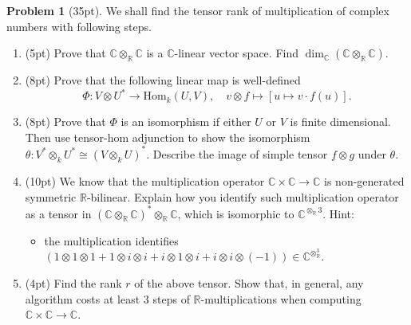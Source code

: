 \documentclass{MainStyle}
\theoremstyle{definition}
\newtheorem{problem}{Problem}
\begin{document}
\begin{problem}[35pt]
We shall find the tensor rank of multiplication of complex numbers with following steps.
\begin{enumerate}
    \item (5pt) Prove that $\mathbb C\otimes _{\mathbb R}\mathbb C$ is a $\mathbb C$-linear vector space. Find $\dim_{\mathbb C}(\mathbb C\otimes _{\mathbb R}\mathbb C)$.
    \item (8pt) Prove that the following linear map is well-defined
          \begin{equation}
              \Phi: V\otimes U^\ast\to \mathrm{Hom}_k(U,V),\quad v\otimes f\mapsto [u\mapsto v\cdot f(u)].
          \end{equation}
    \item (8pt) Prove that $\Phi$ is an isomorphism if either $U$ or $V$ is finite dimensional. Then use tensor-hom adjunction to show the isomorphism $\theta: V^\ast \otimes_k U^\ast \cong (V\otimes_k U)^\ast$. Describe the image of simple tensor $f\otimes g$ under $\theta$.
    \item (10pt) We know that the multiplication operator $\mathbb C\times \mathbb C\to \mathbb C$ is non-generated symmetric $\mathbb R$-bilinear. Explain how you identify such multiplication operator as a tensor in $(\mathbb C\otimes _{\mathbb R}\mathbb C)^\ast\otimes _{\mathbb R}\mathbb C$, which is isomorphic to $\mathbb C^{\otimes_{\mathbb R} 3}$. Hint:
          \begin{itemize}
              \item the multiplication identifies $(1\otimes 1\otimes 1+1\otimes i\otimes i+i\otimes 1\otimes i+i\otimes i\otimes (-1))\in \mathbb C^{\otimes_{\mathbb R}^3}$.
          \end{itemize}
    \item (4pt) Find the rank $r$ of the above tensor. Show that, in general, any algorithm costs at least $3$ steps of $\mathbb R$-multiplications when computing $\mathbb C\times \mathbb C\to \mathbb C$.
\end{enumerate}
\end{problem}
\end{document}
